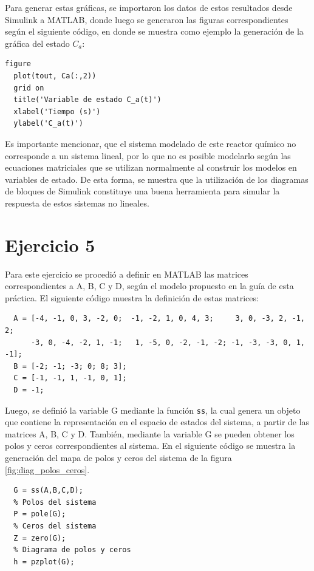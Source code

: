 \documentclass[12pt,letterpaper]{article}
\begin{document}
Para generar estas gráficas, se importaron los datos de estos resultados desde Simulink a MATLAB,
donde luego se generaron las figuras correspondientes según el siguiente código, en donde se muestra
como ejemplo la generación de la gráfica del estado $C_a$:


\begin{lstlisting}[style=Matlab-editor, basicstyle=\mlttfamily]
  figure
  plot(tout, Ca(:,2))
  grid on
  title('Variable de estado C_a(t)')
  xlabel('Tiempo (s)')
  ylabel('C_a(t)')
\end{lstlisting}

Es importante mencionar, que el sistema modelado de este reactor químico no corresponde a un sistema
lineal, por lo que no es posible modelarlo según las ecuaciones matriciales que se utilizan
normalmente al construir los modelos en variables de estado. De esta forma, se muestra que la
utilización de los diagramas de bloques de Simulink constituye una buena herramienta para simular la
respuesta de estos sistemas no lineales.

\section{Ejercicio 5}

Para este ejercicio se procedió a definir en MATLAB las matrices correspondientes a A, B, C y D,
según el modelo propuesto en la guía de esta práctica. El siguiente código muestra la definición de
estas matrices:

\begin{lstlisting}[style=Matlab-editor, basicstyle=\mlttfamily]
  % Matrices del MVE del sistema
  A = [-4, -1, 0, 3, -2, 0;  -1, -2, 1, 0, 4, 3;     3, 0, -3, 2, -1, 2; 
      -3, 0, -4, -2, 1, -1;   1, -5, 0, -2, -1, -2; -1, -3, -3, 0, 1, -1];
  B = [-2; -1; -3; 0; 8; 3];
  C = [-1, -1, 1, -1, 0, 1];
  D = -1;
\end{lstlisting}


Luego, se definió la variable G mediante la función \texttt{ss}, la cual genera un objeto que
contiene la representación en el espacio de estados del sistema, a partir de las matrices A, B, C y
D. También, mediante la variable G se pueden obtener los polos y ceros correspondientes al
sistema. En el siguiente código se muestra la generación del mapa de polos y ceros del sistema de la
figura \ref{fig:diag_polos_ceros}.

\begin{lstlisting}[style=Matlab-editor, basicstyle=\mlttfamily]
  % Representacion en el espacio de estados del sistema
  G = ss(A,B,C,D);
  % Polos del sistema
  P = pole(G);
  % Ceros del sistema
  Z = zero(G);
  % Diagrama de polos y ceros
  h = pzplot(G); 

\end{lstlisting}
\end{document}
